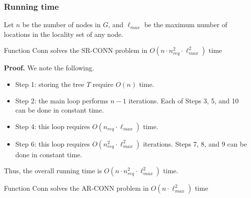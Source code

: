 \documentclass{beamer}
\newcommand{\ARCONN}   { {\mathrm {AR\mbox{-}CONN}} }
\newcommand{\SRCONN}   { {\mathrm {SR\mbox{-}CONN}} }
\newcommand{\fConn}   	{ {\mathrm {Conn}} }
\newcommand{\nReq}    { {n_{req}} }
\begin{document}
\begin{frame}
\frametitle{Running time}
Let $n$ be the number of nodes in $G$, and $\ell_{max}$ be the maximum
number of locations in the locality set of any node.

\begin{theorem}
\normalfont
    Function $\fConn$ solves the $\SRCONN$ problem in
    $O(n \cdot n_{req}^2  \cdot \ell_{max}^2)$ time
\end{theorem}
{\bf Proof.}
We note the following.
\begin{itemize}
\item   Step 1: storing the tree $T$ require $O(n)$ time.

\item	Step 2: the main loop performs $n-1$ iterations.
	Each of Steps 3, 5, and 10 can be done in constant time.

\item	Step 4: this loop requires $O(\nReq \cdot \ell_{max})$ time.

\item	Step 6: this loop requires $O(n_{req}^2 \cdot \ell_{max}^2)$ iterations.
	Steps 7, 8, and 9 can be done in constant time.
\end{itemize}
Thus, the overall running time is $O(n \cdot n_{req}^2  \cdot \ell_{max}^2)$ time.

\begin{theorem}
\normalfont
    Function $\fConn$ solves the $\ARCONN$ problem in
    $O(n \cdot \ell_{max}^2)$ time

\end{theorem}
\end{frame}
\end{document}
